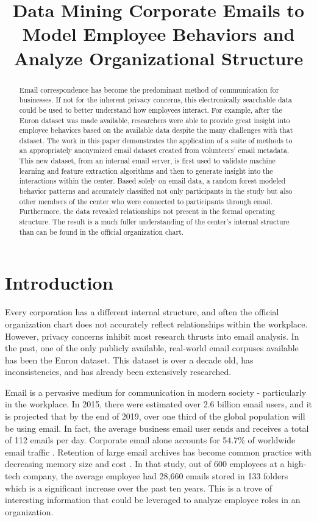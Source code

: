 \documentclass{article}
\begin{document}
\title{Data Mining Corporate Emails to Model Employee Behaviors and Analyze Organizational Structure}
\maketitle

\begin{abstract}
Email correspondence has become the predominant method of communication for businesses.  If not for the inherent privacy concerns, this electronically searchable data could be used to better understand how employees interact. For example, after the Enron dataset was made available, researchers were able to provide great insight into employee behaviors based on the available data despite the many challenges with that dataset.  The work in this paper demonstrates the application of a suite of methods to an appropriately anonymized email dataset created from volunteers' email metadata.  This new dataset, from an internal email server, is first used to validate machine learning and feature extraction algorithms and then to generate insight into the interactions within the center.  Based solely on email data, a random forest  modeled behavior patterns and accurately classified not only participants in the study but also other members of the center who were connected to participants through email.  Furthermore, the data revealed relationships not present in the formal operating structure.  The result is a much fuller understanding of the center's internal structure than can be found in the official organization chart.
\end{abstract}

\section{Introduction}
Every corporation has a different internal structure, and often the official organization chart does not accurately reflect relationships within the workplace.  However, privacy concerns inhibit most research thrusts into email analysis.  In the past, one of the only publicly available, real-world email corpuses available has been the Enron dataset.  This dataset is over a decade old, has inconsistencies, and has already been extensively researched.  

Email is a pervasive medium for communication in modern society - particularly in the workplace.  In 2015, there were estimated over 2.6 billion email users, and it is projected that by the end of 2019, over one third of the global population will be using email.  In fact, the average business email user sends and receives a total of 112 emails per day.  Corporate email alone accounts for 54.7\% of worldwide email traffic \cite{radicati_emails_2015}. Retention of large email archives has become common practice with decreasing memory size and cost \cite{fisher_revisiting_2006}.  In that study, out of 600 employees at a high-tech company, the average employee had 28,660 emails stored in 133 folders which is a significant increase over the past ten years.  This is a trove of interesting information that could be leveraged to analyze employee roles in an organization.
\end{document}
